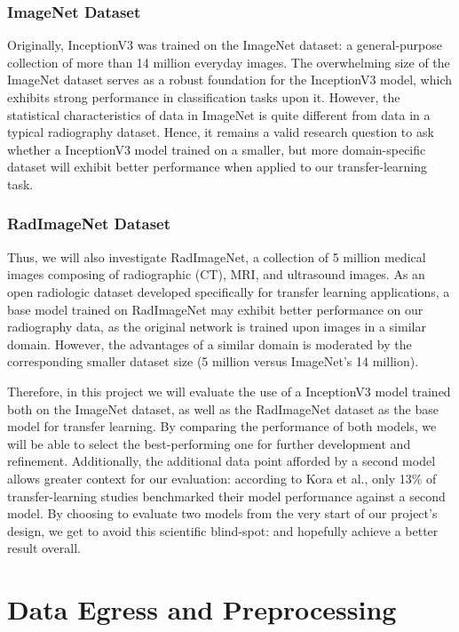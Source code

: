 \subsubsection{ImageNet Dataset}
Originally, InceptionV3 was trained on the ImageNet dataset: a general-purpose collection of more than 14 million everyday images. \autocite{imagenet} The overwhelming size of the ImageNet dataset serves as a robust foundation for the InceptionV3 model, which exhibits strong performance in classification tasks upon it. However, the statistical characteristics of data in ImageNet is quite different from data in a typical radiography dataset. Hence, it remains a valid research question to ask whether a InceptionV3 model trained on a smaller, but more domain-specific dataset will exhibit better performance when applied to our transfer-learning task.

\subsubsection{RadImageNet Dataset}
Thus, we will also investigate RadImageNet, a collection of 5 million medical images composing of radiographic (CT), MRI, and ultrasound images. \autocite{radimagenet} As an open radiologic dataset developed specifically for transfer learning applications, a base model trained on RadImageNet may exhibit better performance on our radiography data, as the original network is trained upon images in a similar domain. However, the advantages of a similar domain is moderated by the corresponding smaller dataset size (5 million versus ImageNet's 14 million).

Therefore, in this project we will evaluate the use of a InceptionV3 model trained both on the ImageNet dataset, as well as the RadImageNet dataset as the base model for transfer learning. By comparing the performance of both models, we will be able to select the best-performing one for further development and refinement. Additionally, the additional data point afforded by a second model allows greater context for our evaluation: according to Kora et al., only 13\% of transfer-learning studies benchmarked their model performance against a second model. \autocite[94]{kora2022} By choosing to evaluate two models from the very start of our project's design, we get to avoid this scientific blind-spot: and hopefully achieve a better result overall.

\section{Data Egress and Preprocessing}

